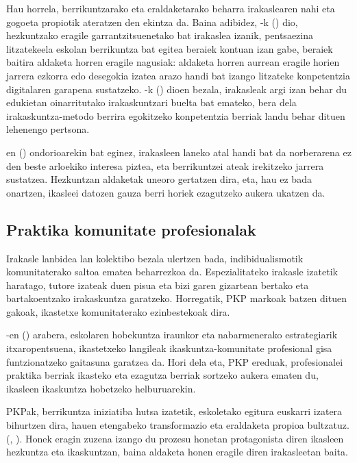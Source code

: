 Hau horrela, berrikuntzarako eta eraldaketarako beharra irakaslearen nahi eta gogoeta propiotik ateratzen den ekintza da. Baina adibidez, \citeauthor{perez2014irakasleen}-k (\citeyear{perez2014irakasleen}) dio, hezkuntzako eragile garrantzitsuenetako bat irakaslea izanik, pentsaezina litzatekeela eskolan berrikuntza bat egitea beraiek kontuan izan gabe, beraiek baitira aldaketa horren eragile nagusiak: aldaketa horren aurrean eragile horien jarrera ezkorra edo desegokia izatea arazo handi bat izango litzateke konpetentzia digitalaren garapena sustatzeko. \citeauthor{arroyo2017competencias}-k (\citeyear{arroyo2017competencias}) dioen bezala, irakasleak argi izan behar du edukietan oinarritutako irakaskuntzari buelta bat emateko, bera dela irakaskuntza-metodo berrira egokitzeko konpetentzia berriak landu behar dituen lehenengo pertsona.

\citeauthor{bosch2018konpetentzia}en (\citeyear{bosch2018konpetentzia}) ondorioarekin bat eginez, irakasleen laneko atal handi bat da norberarena ez den beste arloekiko interesa piztea, eta berrikuntzei ateak irekitzeko jarrera sustatzea. Hezkuntzan aldaketak uneoro gertatzen dira, eta, hau ez bada onartzen, ikasleei datozen gauza berri horiek ezagutzeko aukera ukatzen da.

\subsection{Praktika komunitate profesionalak}\label{subsec:pkp}

Irakasle lanbidea lan kolektibo bezala ulertzen bada, indibidualismotik komunitaterako saltoa ematea beharrezkoa da. Espezialitateko irakasle izatetik haratago, tutore izateak duen pisua eta bizi garen gizartean bertako eta bartakoentzako irakaskuntza garatzeko. Horregatik, PKP markoak batzen dituen gakoak, ikastetxe komunitaterako ezinbestekoak dira.

\citeauthor{dufour1998professional}-en (\citeyear{dufour1998professional}) arabera, eskolaren hobekuntza iraunkor eta nabarmenerako estrategiarik itxaropentsuena, ikastetxeko langileak ikaskuntza-komunitate profesional gisa funtzionatzeko gaitasuna garatzea da. Hori dela eta, PKP ereduak, profesionalei praktika berriak ikasteko eta ezagutza berriak sortzeko aukera ematen du, ikasleen ikaskuntza hobetzeko helburuarekin.

PKPak, berrikuntza iniziatiba hutsa izatetik, eskoletako egitura euskarri izatera bihurtzen dira, hauen etengabeko transformazio eta eraldaketa propioa bultzatuz. (\citeauthor{morrissey2000professional}, \citeyear{morrissey2000professional}). Honek eragin zuzena izango du prozesu honetan protagonista diren ikasleen hezkuntza eta ikaskuntzan, baina aldaketa honen eragile diren irakasleetan baita.

